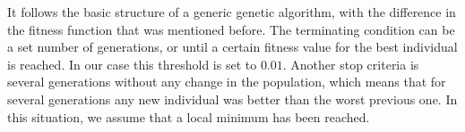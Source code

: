 It follows the basic structure of a generic genetic algorithm, with the difference in the fitness function that was mentioned before. The terminating condition can be a set number of generations, or until a certain fitness value for the best individual is reached. In our case this threshold is set to $0.01$. Another stop criteria is several generations without any change in the population, which means that for several generations any new individual was better than the worst previous one. In this situation, we assume that a local minimum has been reached. 


